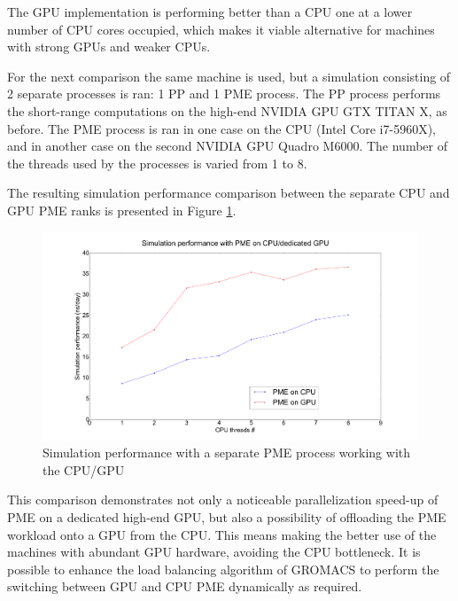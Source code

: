 \documentclass[12pt,a4paper,notitlepage]{report}
\begin{document}
The GPU implementation is performing better than a CPU one at a lower number of CPU cores occupied, which makes it viable alternative for machines with strong GPUs and weaker CPUs. 


For the next comparison the same machine is used, but a simulation consisting of 2 separate processes is ran: 1 PP and 1 PME process. The PP process performs the short-range computations on the high-end NVIDIA GPU GTX TITAN X, as before.    
The PME process is ran in one case on the CPU (Intel Core i7-5960X), and in another case on the second NVIDIA GPU Quadro M6000. The number of the threads used by the processes is varied from 1 to 8.
 
The resulting simulation performance comparison between the separate CPU and GPU PME ranks is presented in Figure \ref{fig:sepGPUNEW}.
 
\FloatBarrier
\begin{figure} [h!]
    \centering
    \includegraphics[width=1\textwidth]{pics/CPU_GPU_ADH.png}
    \caption{Simulation performance with a separate PME process working with the CPU/GPU}
    \label{fig:sepGPUNEW}
\end{figure}
\FloatBarrier

This comparison demonstrates not only a noticeable parallelization speed-up of PME on a dedicated high-end GPU, but also a possibility of offloading the PME workload onto a GPU from the CPU. This means making the better use of the machines with abundant GPU hardware, avoiding the CPU bottleneck. It is possible to enhance the load balancing algorithm of GROMACS to perform the switching between GPU and CPU PME dynamically as required.
\end{document}

